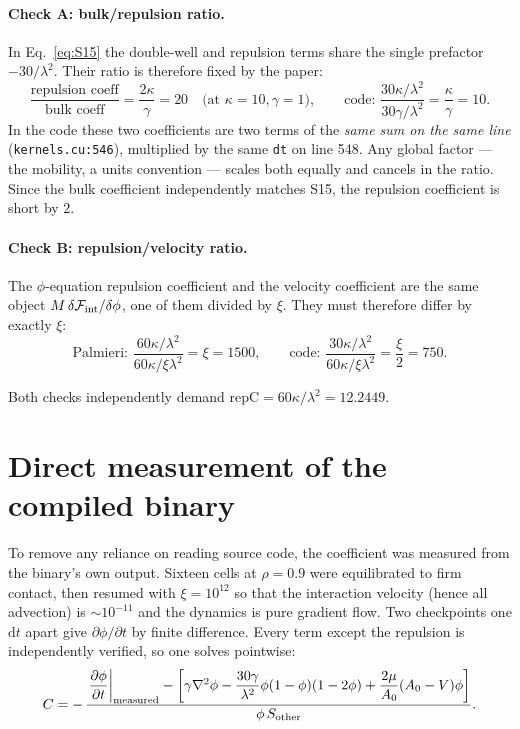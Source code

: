 \documentclass[11pt]{article}
\begin{document}
\paragraph{Check A: bulk/repulsion ratio.}
In Eq.~\eqref{eq:S15} the double-well and repulsion terms share the single
prefactor $-30/\lambda^2$. Their ratio is therefore fixed by the paper:
\[
\frac{\text{repulsion coeff}}{\text{bulk coeff}} = \frac{2\kappa}{\gamma} = 20
\quad\text{(at }\kappa=10,\gamma=1\text{)},
\qquad\text{code: } \frac{30\kappa/\lambda^2}{30\gamma/\lambda^2} = \frac{\kappa}{\gamma} = 10 .
\]
In the code these two coefficients are two terms of the \emph{same sum on the
same line} (\texttt{kernels.cu:546}), multiplied by the same \texttt{dt} on
line 548. Any global factor --- the mobility, a units convention --- scales
both equally and cancels in the ratio. Since the bulk coefficient
independently matches S15, the repulsion coefficient is short by $2$.

\paragraph{Check B: repulsion/velocity ratio.}
The $\phi$-equation repulsion coefficient and the velocity coefficient are the
same object $M\,\delta\mathcal{F}_{\rm int}/\delta\phi$, one of them divided by
$\xi$. They must therefore differ by exactly $\xi$:
\[
\text{Palmieri: } \frac{60\kappa/\lambda^2}{60\kappa/\xi\lambda^2} = \xi = 1500 ,
\qquad
\text{code: } \frac{30\kappa/\lambda^2}{60\kappa/\xi\lambda^2} = \frac{\xi}{2} = 750 .
\]

Both checks independently demand $\text{repC} = 60\kappa/\lambda^2 = 12.2449$.

\section{Direct measurement of the compiled binary}
\label{sec:measurement}

To remove any reliance on reading source code, the coefficient was measured
from the binary's own output. Sixteen cells at $\rho=0.9$ were equilibrated to
firm contact, then resumed with $\xi=10^{12}$ so that the interaction velocity
(hence all advection) is $\sim10^{-11}$ and the dynamics is pure gradient flow.
Two checkpoints one $\mathrm{d}t$ apart give $\partial\phi/\partial t$ by finite
difference. Every term except the repulsion is independently verified, so one
solves pointwise:
\begin{equation}
C = -\,\frac{\left.\dfrac{\partial\phi}{\partial t}\right|_{\rm measured}
   - \left[\gamma\nabla^2\phi - \dfrac{30\gamma}{\lambda^2}\phi(1-\phi)(1-2\phi)
     + \dfrac{2\mu}{A_0}(A_0-V)\phi\right]}
  {\phi\,S_{\rm other}} .
\end{equation}
\end{document}
